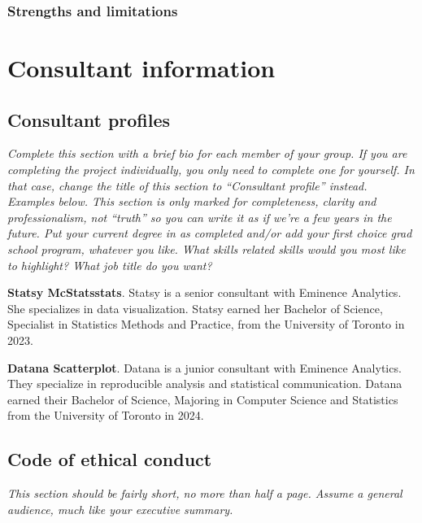 \documentclass[
          english,
          paper=a4,
              ,captions=tableheading
  ]{scrartcl}
\begin{document}
\hypertarget{strengths-and-limitations}{%
\subsubsection{Strengths and
limitations}\label{strengths-and-limitations}}

\newpage

\hypertarget{consultant-information}{%
\section{Consultant information}\label{consultant-information}}

\hypertarget{consultant-profiles}{%
\subsection{Consultant profiles}\label{consultant-profiles}}

\emph{Complete this section with a brief bio for each member of your
group. If you are completing the project individually, you only need to
complete one for yourself. In that case, change the title of this
section to \enquote{Consultant profile} instead. Examples below. This
section is only marked for completeness, clarity and professionalism,
not \enquote{truth} so you can write it as if we're a few years in the
future. Put your current degree in as completed and/or add your first
choice grad school program, whatever you like. What skills related
skills would you most like to highlight? What job title do you want?}

\textbf{Statsy McStatsstats}. Statsy is a senior consultant with
Eminence Analytics. She specializes in data visualization. Statsy earned
her Bachelor of Science, Specialist in Statistics Methods and Practice,
from the University of Toronto in 2023.

\textbf{Datana Scatterplot}. Datana is a junior consultant with Eminence
Analytics. They specialize in reproducible analysis and statistical
communication. Datana earned their Bachelor of Science, Majoring in
Computer Science and Statistics from the University of Toronto in 2024.

\hypertarget{code-of-ethical-conduct}{%
\subsection{Code of ethical conduct}\label{code-of-ethical-conduct}}

\emph{This section should be fairly short, no more than half a page.
Assume a general audience, much like your executive summary.}
\end{document}
